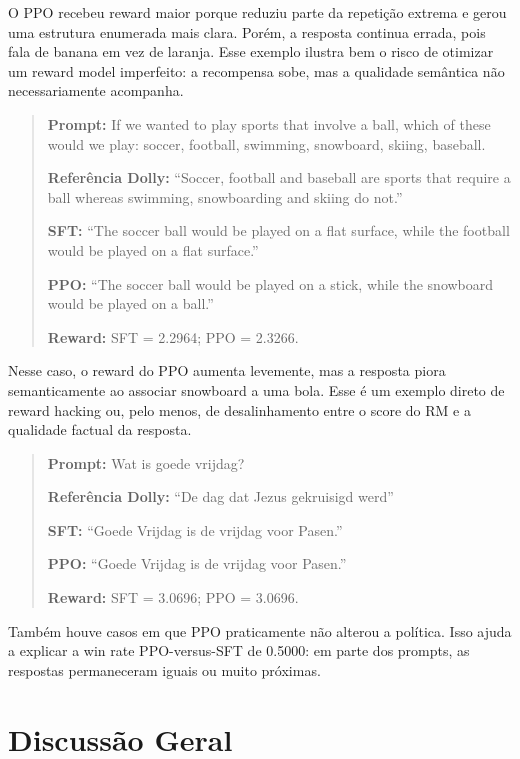 \documentclass[a4paper,12pt]{article}
\begin{document}
O PPO recebeu reward maior porque reduziu parte da repetição extrema e gerou uma estrutura enumerada mais clara. Porém, a resposta continua errada, pois fala de banana em vez de laranja. Esse exemplo ilustra bem o risco de otimizar um reward model imperfeito: a recompensa sobe, mas a qualidade semântica não necessariamente acompanha.

\begin{quote}
\small
\textbf{Prompt:} If we wanted to play sports that involve a ball, which of these would we play: soccer, football, swimming, snowboard, skiing, baseball.

\textbf{Referência Dolly:} ``Soccer, football and baseball are sports that require a ball whereas swimming, snowboarding and skiing do not.''

\textbf{SFT:} ``The soccer ball would be played on a flat surface, while the football would be played on a flat surface.''

\textbf{PPO:} ``The soccer ball would be played on a stick, while the snowboard would be played on a ball.''

\textbf{Reward:} SFT = 2.2964; PPO = 2.3266.
\end{quote}

Nesse caso, o reward do PPO aumenta levemente, mas a resposta piora semanticamente ao associar snowboard a uma bola. Esse é um exemplo direto de reward hacking ou, pelo menos, de desalinhamento entre o score do RM e a qualidade factual da resposta.

\begin{quote}
\small
\textbf{Prompt:} Wat is goede vrijdag?

\textbf{Referência Dolly:} ``De dag dat Jezus gekruisigd werd''

\textbf{SFT:} ``Goede Vrijdag is de vrijdag voor Pasen.''

\textbf{PPO:} ``Goede Vrijdag is de vrijdag voor Pasen.''

\textbf{Reward:} SFT = 3.0696; PPO = 3.0696.
\end{quote}

Também houve casos em que PPO praticamente não alterou a política. Isso ajuda a explicar a win rate PPO-versus-SFT de 0.5000: em parte dos prompts, as respostas permaneceram iguais ou muito próximas.

\section{Discussão Geral}
\end{document}
